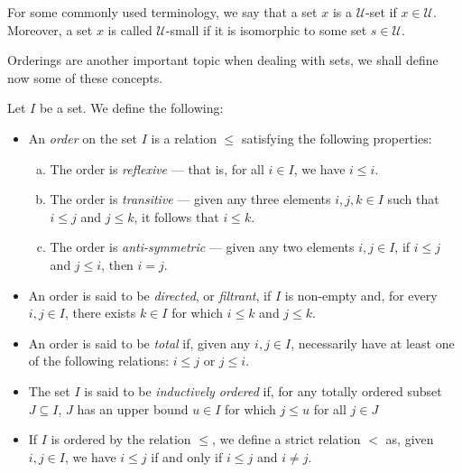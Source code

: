For some commonly used terminology, we say that a set \(x\) is a \(\mathcal
U\)-set if \(x \in \mathcal U\). Moreover, a set \(x\) is called \(\mathcal
U\)-small if it is isomorphic to some set \(s \in \mathcal U\).

Orderings are another important topic when dealing with sets, we shall define
now some of these concepts.

\begin{definition}
    \label{def:ordering-miscellaneous}
    Let \(I\) be a set. We define the following:
    \begin{itemize}\setlength\itemsep{0em}
        \item An \emph{order} on the set \(I\) is a relation \(\leq\) satisfying the
              following properties:
              \begin{enumerate}[(a)]\setlength\itemsep{0em}
                  \item The order is \emph{reflexive} --- that is, for all \(i \in I\), we have
                        \(i \leq i\).
                  \item The order is \emph{transitive} --- given any three elements \(i, j, k
                        \in I\) such that \(i \leq j\) and \(j \leq k\), it follows that \(i \leq
                        k\).
                  \item The order is \emph{anti-symmetric} --- given any two elements \(i, j \in
                        I\), if \(i \leq j\) and \(j \leq i\), then \(i = j\).
              \end{enumerate}
        \item An order is said to be \emph{directed}, or \emph{filtrant}, if \(I\) is
              non-empty and, for every \(i, j \in I\), there exists \(k \in I\) for which
              \(i \leq k\) and \(j \leq k\).
        \item An order is said to be \emph{total} if, given any \(i, j \in I\),
              necessarily have at least one of the following relations: \(i \leq j\) or \(j
              \leq i\).
        \item The set \(I\) is said to be \emph{inductively ordered} if, for any totally
              ordered subset \(J \subseteq I\), \(J\) has an upper bound \(u \in I\) for
              which \(j \leq u\) for all \(j \in J\)
        \item If \(I\) is ordered by the relation \(\leq\), we define a strict relation
              \(<\) as, given \(i, j \in I\), we have \(i \leq j\) if and only if \(i \leq
              j\) and \(i \neq j\).
    \end{itemize}
\end{definition}

